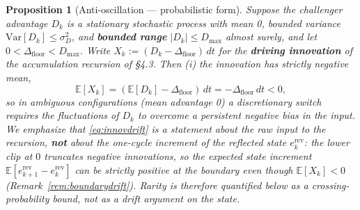 \documentclass[11pt]{article}
\newtheorem{proposition}{Proposition}
\newcommand{\Dfloor}{\Delta_{\text{floor}}}
\newcommand{\Erev}{e^{\text{rev}}}
\begin{document}
\begin{proposition}[Anti-oscillation --- probabilistic form] \label{prop:p1}
Suppose the challenger advantage $D_k$ is a stationary stochastic process with mean 0, bounded variance $\mathrm{Var}[D_k] \le \sigma_D^2$, and \textbf{bounded range} $|D_k| \le D_{\max}$ almost surely, and let $0 < \Dfloor < D_{\max}$. Write $X_k := (D_k - \Dfloor)\,dt$ for the \textbf{driving innovation} of the accumulation recursion of \S4.3. Then (i) the innovation has strictly negative mean,
\begin{equation}
\mathbb{E}[X_k] = (\mathbb{E}[D_k] - \Dfloor)\,dt = -\Dfloor\, dt < 0,
\label{eq:innovdrift}
\end{equation}
so in ambiguous configurations (mean advantage 0) a discretionary switch requires the fluctuations of $D_k$ to overcome a persistent negative bias in the input. We emphasize that \eqref{eq:innovdrift} is a statement about the \emph{raw input} to the recursion, \textbf{not} about the one-cycle increment of the reflected state $\Erev_k$: the lower clip at $0$ truncates negative innovations, so the expected state increment $\mathbb{E}[\Erev_{k+1} - \Erev_k]$ can be strictly positive at the boundary even though $\mathbb{E}[X_k] < 0$ (Remark~\ref{rem:boundarydrift}). Rarity is therefore quantified below as a crossing-probability bound, not as a drift argument on the state.


\end{proposition}
\end{document}
